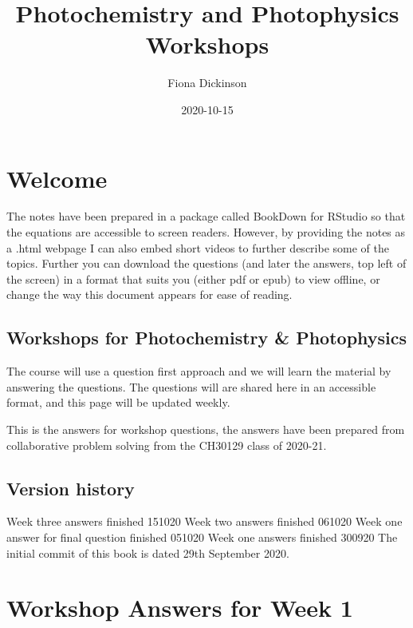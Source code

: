\documentclass[
]{book}
\title{Photochemistry and Photophysics Workshops}
\author{Fiona Dickinson}
\date{2020-10-15}
\begin{document}
\maketitle

{
\setcounter{tocdepth}{1}
\tableofcontents
}
\hypertarget{welcome}{%
\chapter*{Welcome}\label{welcome}}

The notes have been prepared in a package called BookDown for RStudio so that the equations are accessible to screen readers. However, by providing the notes as a .html webpage I can also embed short videos to further describe some of the topics. Further you can download the questions (and later the answers, top left of the screen) in a format that suits you (either pdf or epub) to view offline, or change the way this document appears for ease of reading.

\hypertarget{workshops-for-photochemistry-photophysics}{%
\section*{Workshops for Photochemistry \& Photophysics}\label{workshops-for-photochemistry-photophysics}}

The course will use a question first approach and we will learn the material by answering the questions. The questions will are shared here in an accessible format, and this page will be updated weekly.

This is the answers for workshop questions, the answers have been prepared from collaborative problem solving from the CH30129 class of 2020-21.

\hypertarget{version-history}{%
\section*{Version history}\label{version-history}}

Week three answers finished 151020
Week two answers finished 061020
Week one answer for final question finished 051020
Week one answers finished 300920
The initial commit of this book is dated 29th September 2020.

\hypertarget{ch:Workshop1}{%
\chapter{Workshop Answers for Week 1}\label{ch:Workshop1}}
\end{document}
